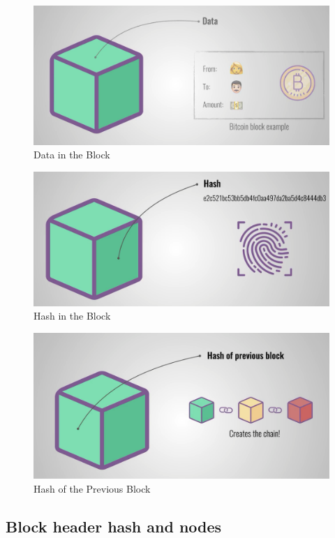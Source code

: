 \begin{figure}[H]
	\centering
	\includegraphics[scale=0.2]{data_block.png}
	\caption{Data in the Block}
\end{figure}

\begin{figure}[H]
	\centering
	\includegraphics[scale=0.2]{hash_block.png}
	\caption{Hash in the Block}
\end{figure}

\begin{figure}[H]
	\centering
	\includegraphics[scale=0.2]{previous_block.png}
	\caption{Hash of the Previous Block}
\end{figure}

\subsection{Block header hash and nodes}

